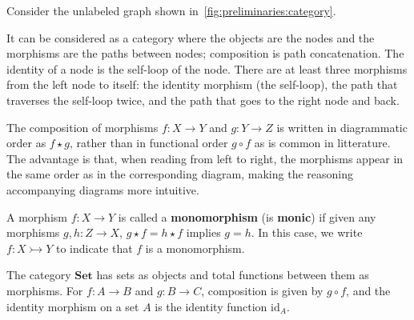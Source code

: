 \begin{example}
    Consider the unlabeled graph shown in~\autoref{fig:preliminaries:category}. 
        \begin{figure}[H]
        \centering
        \caption{}
        \label{fig:preliminaries:category}
    \end{figure}
    It can be considered as a category where the objects are the nodes and the morphisms are the paths between nodes; composition is path concatenation. The identity of a node is the self-loop of the node. There are at least three morphisms from the left node to itself: the identity morphism (the self-loop), the path that traverses the self-loop twice, and the path that goes to the right node and back.
\end{example}

\begin{notation}
    The composition of morphisms \( f : X \to Y \) and \( g : Y \to Z \) is written in diagrammatic order as \( f \star g \), rather than in functional order \( g \circ f \) as is common in litterature. The advantage is that, when reading from left to right, the morphisms appear in the same order as in the corresponding diagram, making the reasoning accompanying diagrams more intuitive. 
\end{notation}  

\begin{definition}[Monomorphism]
    \label{def:cat:homo}
    A morphism \( f : X \to Y \) is called a \textbf{monomorphism} (is \textbf{monic}) if given any morphisms \( g,h: Z \to X  \), \( g \star f = h \star f \) implies \( g = h \). 
    In this case, we write $f : X \rightarrowtail Y$ to indicate that $f$ is a monomorphism.
\end{definition} 

\begin{example}
The category \(\mathbf{Set}\) has sets as objects and total functions between them as morphisms. For \(f\colon A\to B\) and \(g\colon B\to C\), composition is given by \(g\circ f\), and the identity morphism on a set \(A\) is the identity function \(\mathrm{id}_A\).
\end{example}

